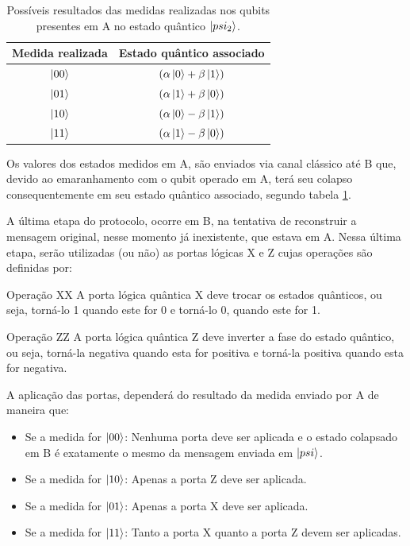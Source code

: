 \documentclass[11pt,oneside,brazil,hidelinks,article,sumario=tradicional,a4paper]{abntex2}
\begin{document}
\begin{table}[ht!]
\centering
\caption{Possíveis resultados das medidas realizadas nos qubits presentes em A no estado quântico $\ket{psi_2}$.}\label{medidas}
\begin{tabular}{cc}
 {Medida realizada} & {Estado quântico associado}\\
 \hline
 $\ket{00}$   & $\left( \alpha \ket{0} + \beta \ket{1} \right)$\\
 $\ket{01}$   & $\left( \alpha \ket{1} + \beta \ket{0} \right)$\\
 $\ket{10}$   & $\left( \alpha \ket{0} - \beta \ket{1} \right)$\\
 $\ket{11}$   & $\left( \alpha \ket{1} - \beta \ket{0} \right)$

  \end{tabular}
\end{table}

Os valores dos estados medidos em A, são enviados via canal clássico até B que, devido ao emaranhamento com o qubit operado em A, terá seu colapso consequentemente em seu estado quântico associado, segundo tabela \ref{medidas}.

A última etapa do protocolo, ocorre em B, na tentativa de reconstruir a mensagem original, nesse momento já inexistente, que estava em A. Nessa última etapa, serão utilizadas (ou não) as portas lógicas X e Z cujas operações são definidas por:

\begin{theo}{Operação X}{X}
A porta lógica quântica X deve trocar os estados quânticos, ou seja, torná-lo 1 quando este for 0 e torná-lo 0, quando este for 1.
\end{theo}

\begin{theo}{Operação Z}{Z}
A porta lógica quântica Z deve inverter a fase do estado quântico, ou seja, torná-la negativa quando esta for positiva e torná-la positiva quando esta for negativa.
\end{theo}

A aplicação das portas, dependerá do resultado da medida enviado por A de maneira que:

\begin{itemize}
\item Se a medida for $\ket{00}$: Nenhuma porta deve ser aplicada e o estado colapsado em B é exatamente o mesmo da mensagem enviada em $\ket{psi}$.
\item Se a medida for $\ket{10}$: Apenas a porta Z deve ser aplicada.
\item Se a medida for $\ket{01}$: Apenas a porta X deve ser aplicada.
\item Se a medida for $\ket{11}$: Tanto a porta X quanto a porta Z devem ser aplicadas.
\end{itemize}
\end{document}

